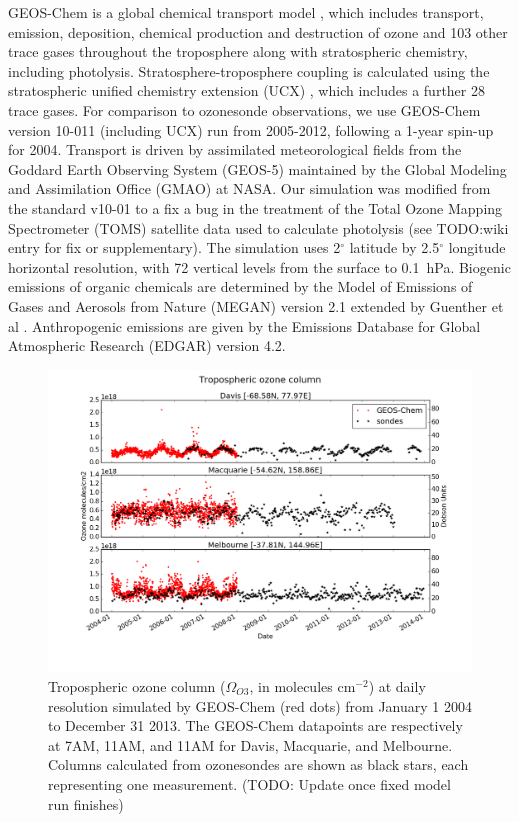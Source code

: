 \documentclass{article}
\begin{document}
  GEOS-Chem is a global chemical transport model \citep{Bey2001}, which includes transport, emission, deposition, chemical production and destruction of ozone and 103 other trace gases throughout the troposphere along with stratospheric chemistry, including photolysis. 
  Stratosphere-troposphere coupling is calculated using the stratospheric unified chemistry extension (UCX) \citep{Eastham2014}, which includes a further 28 trace gases.
  For comparison to ozonesonde observations, we use GEOS-Chem version 10-011 (including UCX) run from 2005-2012, following a 1-year spin-up for 2004.
  Transport is driven by assimilated meteorological fields from the Goddard Earth Observing System (GEOS-5) maintained by the Global Modeling and Assimilation Office (GMAO) at NASA.
  Our simulation was modified from the standard v10-01 to a fix a bug in the treatment of the Total Ozone Mapping Spectrometer (TOMS) satellite data used to calculate photolysis (see TODO:wiki entry for fix or supplementary).
  The simulation uses 2$^{\circ}$ latitude by 2.5$^{\circ}$ longitude horizontal resolution, with 72 vertical levels from the surface to 0.1~hPa.
  Biogenic emissions of organic chemicals are determined by the Model of Emissions of Gases and Aerosols from Nature (MEGAN) version 2.1 extended by Guenther et al \citep{Guenther2012}.
  Anthropogenic emissions are given by the Emissions Database for Global Atmospheric Research (EDGAR) version 4.2.
  
  
  \begin{figure}[!htbp]
    \includegraphics[width=\textwidth]{figures/StationSeries.png}
    \caption{Tropospheric ozone column ($\Omega_{O3}$, in molecules cm$^{-2}$) at daily resolution simulated by GEOS-Chem (red dots) from January 1 2004 to December 31 2013.
    The GEOS-Chem datapoints are respectively at 7AM, 11AM, and 11AM for Davis, Macquarie, and Melbourne.
    Columns calculated from ozonesondes are shown as black stars, each representing one measurement. (TODO: Update once fixed model run finishes)}
    \label{fig:StationSeriesGEOSChem}
  \end{figure}
  
\end{document}
